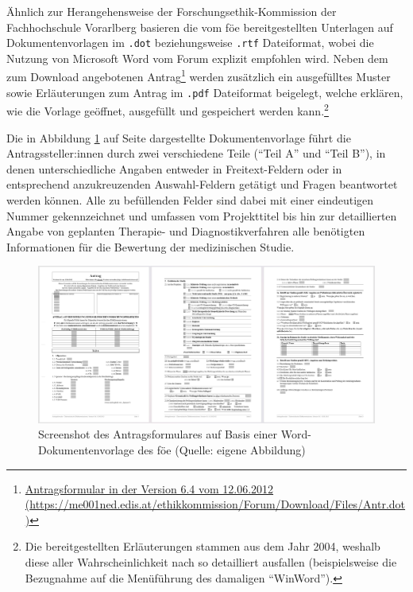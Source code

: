 \documentclass[a4paper,12pt,twoside]{scrreprt}
\begin{document}
Ähnlich zur Herangehensweise der Forschungsethik-Kommission der Fachhochschule Vorarlberg basieren die vom \ac{föe} bereitgestellten Unterlagen auf Dokumentenvorlagen im \texttt{.dot} beziehungsweise \texttt{.rtf} Dateiformat, wobei die Nutzung von Microsoft Word vom Forum explizit empfohlen wird. Neben dem zum Download angebotenen Antrag\footnote{\href{https://me001ned.edis.at/ethikkommission/Forum/Download/Files/Antr.dot}{Antragsformular in der Version 6.4 vom 12.06.2012 (\url{https://me001ned.edis.at/ethikkommission/Forum/Download/Files/Antr.dot})}} werden zusätzlich ein ausgefülltes Muster sowie Erläuterungen zum Antrag im \texttt{.pdf} Dateiformat beigelegt, welche erklären, wie die Vorlage geöffnet, ausgefüllt und gespeichert werden kann.\footnote{Die bereitgestellten Erläuterungen stammen aus dem Jahr 2004, weshalb diese aller Wahrscheinlichkeit nach so detailliert ausfallen (beispielsweise die Bezugnahme auf die Menüführung des damaligen \enquote{WinWord}).} \cite{ethikkommission_der_medizinischen_universitat_graz_download_2012}

Die in Abbildung \ref{fig:dokumentenvorlage-föe} auf Seite \pageref{fig:dokumentenvorlage-föe} dargestellte Dokumentenvorlage führt die Antragssteller:innen durch zwei verschiedene Teile (\enquote{Teil A} und \enquote{Teil B}), in denen unterschiedliche Angaben entweder in Freitext-Feldern oder in entsprechend anzukreuzenden Auswahl-Feldern getätigt und Fragen beantwortet werden können. Alle zu befüllenden Felder sind dabei mit einer eindeutigen Nummer gekennzeichnet und umfassen vom Projekttitel bis hin zur detaillierten Angabe von geplanten Therapie- und Diagnostikverfahren alle benötigten Informationen für die Bewertung der medizinischen Studie.

\begin{figure}[ht]
    \centering
    \includegraphics[scale=0.21]{thesis/images/Luidold_Word-Vorlage-Forum-Oesterreichischer-Ethikkommissionen.png}
    \caption[Screenshot der Word-Dokumentenvorlage des Forums Österreichischer Ethikkommissionen]{Screenshot des Antragsformulares auf Basis einer Word-Dokumentenvorlage des \ac{föe} (Quelle: eigene Abbildung)}
    \label{fig:dokumentenvorlage-föe}
\end{figure}
\end{document}
